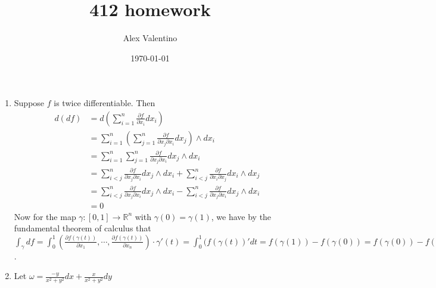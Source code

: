 \documentclass[12pt, letterpaper]{article}
\date{\today}
\author{Alex Valentino}
\title{412 homework}
\newcommand{\R}{\mathbb{R}}
\begin{document}
\begin{enumerate}
	\item Suppose $f$ is twice differentiable.  Then 
	\begin{align*}
		d(df) &= d \left(\sum_{i=1}^n \frac{\partial f}{\partial x_i}dx_i \right)\\
		&= \sum_{i=1}^n \left( \sum_{j=1}^n 
		\frac{\partial f}{\partial x_j \partial x_i} dx_j
		\right) \wedge dx_i\\
		&= \sum_{i=1}^n \sum_{j=1}^n\frac{\partial f}{\partial x_j \partial x_i} dx_j \wedge dx_i\\
		&= \sum_{i < j}^n  \frac{\partial f}{\partial x_j \partial x_i} dx_j \wedge dx_i
		+ \sum_{i < j}^n \frac{\partial f}{\partial x_i \partial x_j} dx_i \wedge dx_j\\
		&= \sum_{i < j}^n  \frac{\partial f}{\partial x_j \partial x_i} dx_j \wedge dx_i
		- \sum_{i < j}^n \frac{\partial f}{\partial x_j \partial x_i} dx_j \wedge dx_i\\
		&= 0
	\end{align*}
	Now for the map $\gamma : [0,1] \to \R^n$ with 
	$\gamma(0) = \gamma(1)$, we have by the fundamental 
	theorem of calculus that 
	$\int_\gamma df = \int_0^1 \left( \frac{\partial f (\gamma(t))}{\partial x_1},\cdots,\frac{\partial f (\gamma(t))}{\partial x_n} \right)\cdot \gamma'(t) = 
	\int_0^1 (f(\gamma(t))'dt = f(\gamma(1)) - f(\gamma(0)) = f(\gamma(0)) - f(\gamma(0)) = 0$.  
	\item Let $\omega = 
	\frac{-y}{x^2 + y^2}dx + \frac{x}{x^2 + y^2}dy$
\end{enumerate}
\end{document}

